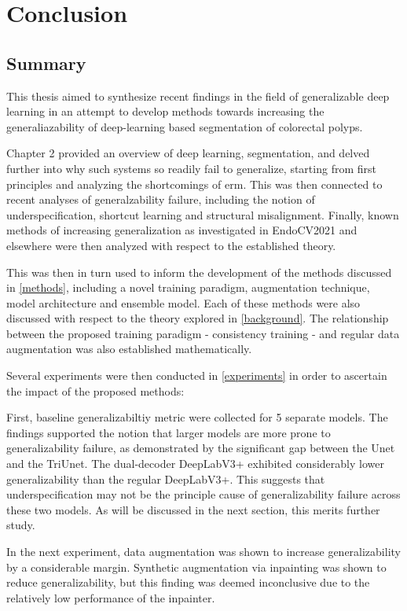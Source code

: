 \chapter{Conclusion}\label{conclusion}
\section{Summary}
This thesis aimed to synthesize recent findings in the field of generalizable deep learning in an attempt to develop methods towards increasing the generaliazability of deep-learning based segmentation of colorectal polyps.

Chapter 2 provided an overview of deep learning, segmentation, and delved further into why such systems so readily fail to generalize, starting from first principles and analyzing the shortcomings of \gls{erm}. This was then connected to recent analyses of generalzability failure, including the notion of underspecification, shortcut learning and structural misalignment. Finally, known methods of increasing generalization as investigated in EndoCV2021 and elsewhere were then analyzed with respect to the established theory. 

This was then in turn used to inform the development of the methods discussed in \autoref{methods}, including a novel training paradigm, augmentation technique, model architecture and ensemble model. Each of these methods were also discussed with respect to the theory explored in \autoref{background}. The relationship between the proposed training paradigm - consistency training - and regular data augmentation was also established mathematically.

Several experiments were then conducted in \autoref{experiments} in order to ascertain the impact of the proposed methods:

First, baseline generalizabiltiy metric were collected for 5 separate models. The findings supported the notion that larger models are more prone to generalizability failure, as demonstrated by the significant gap between the Unet and the TriUnet. The dual-decoder DeepLabV3+ exhibited considerably lower generalizability than the regular DeepLabV3+. This suggests that underspecification may not be the principle cause of generalizability failure across these two models. As will be discussed in the next section, this merits further study.

In the next experiment, data augmentation was shown to increase generalizability by a considerable margin. Synthetic augmentation via inpainting was shown to reduce generalizability, but this finding was deemed inconclusive due to the relatively low performance of the inpainter. 


